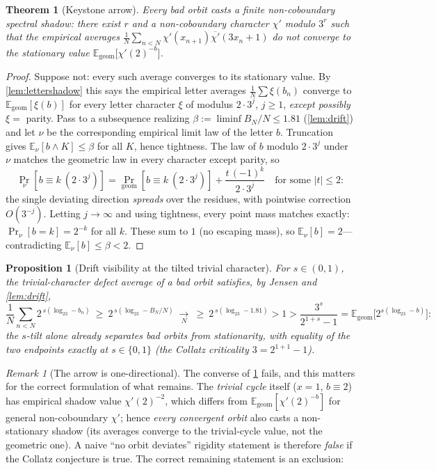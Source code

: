 \documentclass[11pt]{article}
\newcommand{\E}{\mathbb{E}}
\theoremstyle{plain}
\newtheorem{theorem}{Theorem}
\newtheorem{proposition}{Proposition}
\theoremstyle{definition}
\theoremstyle{remark}
\newtheorem*{remark}{Remark}
\begin{document}
\begin{theorem}[Keystone arrow]\label{thm:keystone}
Every bad orbit casts a finite non-coboundary spectral shadow: there
exist $r$ and a non-coboundary character $\chi'$ modulo $3^r$ such that
the empirical averages
$\frac1N\sum_{n<N}\chi'(x_{n+1})\overline{\chi'}(3x_n+1)$ do \emph{not}
converge to the stationary value
$\E_{\mathrm{geom}}\bigl[\chi'(2)^{-b}\bigr]$.
\end{theorem}

\begin{proof}
Suppose not: every such average converges to its stationary value. By
\cref{lem:lettershadow} this says the empirical letter averages
$\frac1N\sum\xi(b_n)$ converge to $\E_{\mathrm{geom}}[\xi(b)]$ for every
letter character $\xi$ of modulus $2\cdot3^j$, $j\ge1$, \emph{except
possibly} $\xi=$ parity. Pass to a subsequence realizing
$\beta:=\liminf B_N/N\le1.81$ (\cref{lem:drift}) and let $\nu$ be the
corresponding empirical limit law of the letter $b$. Truncation gives
$\E_\nu[b\wedge K]\le\beta$ for all $K$, hence tightness. The law of $b$
modulo $2\cdot3^j$ under $\nu$ matches the geometric law in every
character except parity, so
\[
\Pr_\nu[b\equiv k\ (2\cdot3^j)]
=\Pr_{\mathrm{geom}}[b\equiv k\ (2\cdot3^j)]+\frac{t\,(-1)^k}{2\cdot3^{j}}
\quad\text{for some }|t|\le2 :
\]
the single deviating direction \emph{spreads} over the residues, with
pointwise correction $O(3^{-j})$. Letting $j\to\infty$ and using
tightness, every point mass matches exactly:
$\Pr_\nu[b=k]=2^{-k}$ for all $k$. These sum to $1$ (no escaping mass),
so $\E_\nu[b]=2$---contradicting $\E_\nu[b]\le\beta<2$.
\end{proof}

\begin{proposition}[Drift visibility at the tilted trivial character]
\label{prop:tiltshadow}
For $s\in(0,1)$, the trivial-character defect average of a bad orbit
satisfies, by Jensen and \cref{lem:drift},
\[
\frac1N\sum_{n<N}2^{\,s(\log_23-b_n)}\ \ge\ 2^{\,s(\log_23-B_N/N)}
\ \xrightarrow[\ N\ ]{}\ \ge\ 2^{\,s(\log_23-1.81)}>1
>\frac{3^s}{2^{1+s}-1}=\E_{\mathrm{geom}}\bigl[2^{s(\log_23-b)}\bigr]:
\]
the $s$-tilt alone already separates bad orbits from stationarity, with
equality of the two endpoints exactly at $s\in\{0,1\}$ (the Collatz
criticality $3=2^{1+1}-1$).
\end{proposition}

\begin{remark}[The arrow is one-directional]\label{rem:onedir}
The converse of \cref{thm:keystone} fails, and this matters for the
correct formulation of what remains. The \emph{trivial cycle} itself
($x=1$, $b\equiv2$) has empirical shadow value $\chi'(2)^{-2}$, which
differs from $\E_{\mathrm{geom}}[\chi'(2)^{-b}]$ for general
non-coboundary $\chi'$; hence \emph{every convergent orbit} also casts a
non-stationary shadow (its averages converge to the trivial-cycle value,
not the geometric one). A naive ``no orbit deviates'' rigidity statement
is therefore \emph{false} if the Collatz conjecture is true. The correct
remaining statement is an exclusion:
\end{remark}
\end{document}

